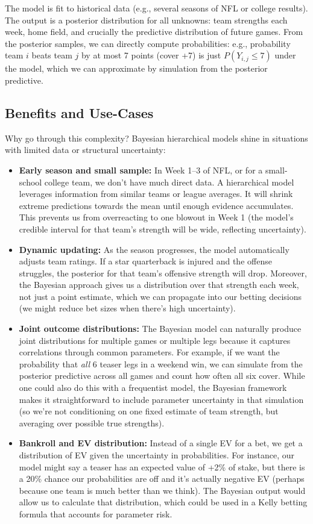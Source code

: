 \documentclass[12pt]{article}
\begin{document}
The model is fit to historical data (e.g., several seasons of NFL or college results). The output is a posterior distribution for all unknowns: team strengths each week, home field, and crucially the predictive distribution of future games. From the posterior samples, we can directly compute probabilities: e.g., probability team $i$ beats team $j$ by at most 7 points (cover +7) is just $P(Y_{i,j} \le 7)$ under the model, which we can approximate by simulation from the posterior predictive.

\subsection{Benefits and Use-Cases}
Why go through this complexity? Bayesian hierarchical models shine in situations with limited data or structural uncertainty:
\begin{itemize}
    \item \textbf{Early season and small sample:} In Week 1--3 of NFL, or for a small-school college team, we don't have much direct data. A hierarchical model leverages information from similar teams or league averages. It will shrink extreme predictions towards the mean until enough evidence accumulates. This prevents us from overreacting to one blowout in Week 1 (the model’s credible interval for that team’s strength will be wide, reflecting uncertainty).
    \item \textbf{Dynamic updating:} As the season progresses, the model automatically adjusts team ratings. If a star quarterback is injured and the offense struggles, the posterior for that team’s offensive strength will drop. Moreover, the Bayesian approach gives us a distribution over that strength each week, not just a point estimate, which we can propagate into our betting decisions (we might reduce bet sizes when there’s high uncertainty).
    \item \textbf{Joint outcome distributions:} The Bayesian model can naturally produce joint distributions for multiple games or multiple legs because it captures correlations through common parameters. For example, if we want the probability that \emph{all} 6 teaser legs in a weekend win, we can simulate from the posterior predictive across all games and count how often all six cover. While one could also do this with a frequentist model, the Bayesian framework makes it straightforward to include parameter uncertainty in that simulation (so we’re not conditioning on one fixed estimate of team strength, but averaging over possible true strengths).
    \item \textbf{Bankroll and EV distribution:} Instead of a single EV for a bet, we get a distribution of EV given the uncertainty in probabilities. For instance, our model might say a teaser has an expected value of +2\% of stake, but there is a 20\% chance our probabilities are off and it’s actually negative EV (perhaps because one team is much better than we think). The Bayesian output would allow us to calculate that distribution, which could be used in a Kelly betting formula that accounts for parameter risk.
\end{itemize}
\end{document}
